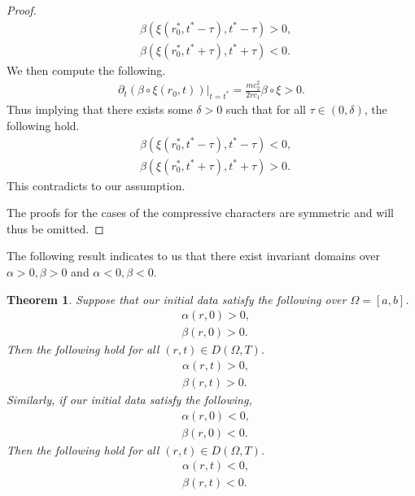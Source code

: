 \documentclass[11pt]{article}
\newtheorem{thm}{Theorem}[section]
\begin{document}
\begin{proof}
\begin{align}
	&\beta(\xi(r_0^*,t^*-\tau),t^*-\tau) > 0, 
	\\
	&\beta(\xi(r_0^*,t^*+\tau),t^*+\tau) < 0. 
\end{align} 
We then compute the following. 
\begin{align}
	\partial_t(\beta\circ\xi(r_0,t))|_{t=t^*} = \frac{mc_2^2}{2rc_1}\beta\circ\xi > 0. 
\end{align} 
Thus implying that there exists some $\delta>0$ such that for all $\tau\in(0,\delta)$, the following hold. 
\begin{align}
	&\beta(\xi(r_0^*,t^*-\tau),t^*-\tau) < 0, 
	\\
	&\beta(\xi(r_0^*,t^*+\tau),t^*+\tau) > 0. 
\end{align} 
This contradicts to our assumption. 


The proofs for the cases of the compressive characters are symmetric and will thus be omitted. 
\end{proof} 

The following result indicates to us that there exist invariant domains over $\alpha>0,\beta>0$ and $\alpha<0,\beta<0$. 

\begin{thm}
	Suppose that our initial data satisfy the following over $\Omega=[a,b]$. 
	\begin{align}
		&\alpha(r,0) > 0, 
		\\
		&\beta(r,0) > 0.
	\end{align} 
	Then the following hold for all $(r,t) \in D(\Omega,T)$. 
	\begin{align}
		&\alpha(r,t) > 0, 
		\\
		&\beta(r,t) > 0. 
	\end{align} 
	Similarly, if our initial data satisfy the following, 
	\begin{align}
		&\alpha(r,0) < 0 ,
		\\
		&\beta(r,0) < 0.
	\end{align} 
	Then the following hold for all $(r,t) \in D(\Omega,T)$. 
	\begin{align}
		&\alpha(r,t) < 0, 
		\\
		&\beta(r,t) < 0. 
	\end{align} 
\end{thm} 
\end{document}

